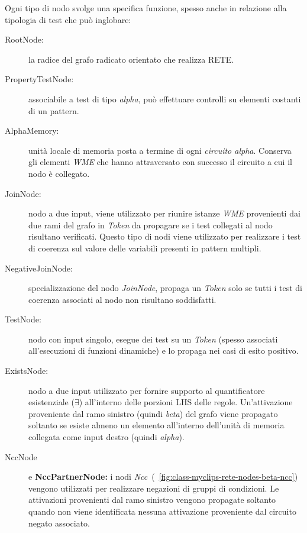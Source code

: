 Ogni tipo di nodo svolge una specifica funzione, spesso anche in relazione alla tipologia di test che può inglobare:
\begin{description}
	\item[RootNode:] la radice del grafo radicato orientato che realizza RETE.
	
	\item[PropertyTestNode:] associabile a test di tipo \emph{alpha}, può effettuare controlli su elementi costanti di un pattern.
	
	\item[AlphaMemory:] unità locale di memoria posta a termine di ogni \emph{circuito alpha}. Conserva gli elementi \emph{WME} che hanno attraversato con successo il circuito a cui il nodo è collegato.
	
	\item[JoinNode:] nodo a due input, viene utilizzato per riunire istanze \emph{WME} provenienti dai due rami del grafo in \emph{Token} da propagare se i test collegati al nodo risultano verificati. Questo tipo di nodi viene utilizzato per realizzare i test di coerenza sul valore delle variabili presenti in pattern multipli.
	
	\item[NegativeJoinNode:] specializzazione del nodo \emph{JoinNode}, propaga un \emph{Token} solo se tutti i test di coerenza associati al nodo non risultano soddisfatti.
	
	\item[TestNode:] nodo con input singolo, esegue dei test su un \emph{Token} (spesso associati all'esecuzioni di funzioni dinamiche) e lo propaga nei casi di esito positivo.

	\item[ExistsNode:] nodo a due input utilizzato per fornire supporto al quantificatore esistenziale ($\exists$) all'interno delle porzioni LHS delle regole. Un'attivazione proveniente dal ramo sinistro (quindi \emph{beta}) del grafo viene propagato soltanto se esiste almeno un elemento all'interno dell'unità di memoria collegata come input destro (quindi \emph{alpha}).
	
	\item[NccNode] e \textbf{NccPartnerNode:} i nodi \emph{Ncc}~(\figurename~\ref{fig:class-myclips-rete-nodes-beta-ncc}) vengono utilizzati per realizzare negazioni di gruppi di condizioni. Le attivazioni provenienti dal ramo sinistro vengono propagate soltanto quando non viene identificata nessuna attivazione proveniente dal circuito negato associato.
	
\end{description} 

